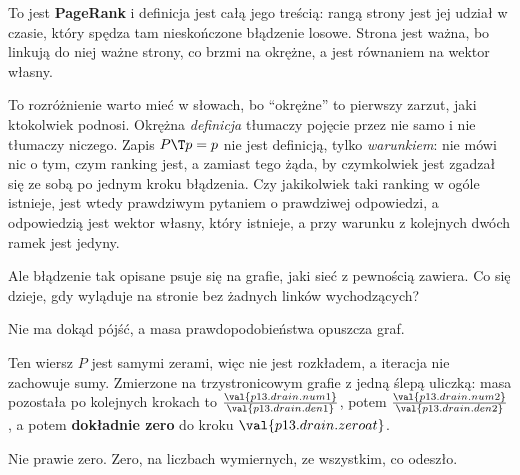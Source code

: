 \begin{fr}
To jest \textbf{PageRank} i definicja jest całą jego
treścią: rangą strony
jest jej udział w czasie, który spędza tam nieskończone błądzenie losowe.
Strona jest ważna, bo linkują do niej ważne strony, co brzmi na okrężne, a
jest równaniem na wektor własny.

To rozróżnienie warto mieć w słowach, bo \enquote{okrężne} to pierwszy
zarzut, jaki ktokolwiek podnosi. Okrężna \emph{definicja} tłumaczy pojęcie
przez nie samo i nie tłumaczy niczego. Zapis $P\T p = p$ nie jest definicją,
tylko \emph{warunkiem}: nie mówi nic o tym, czym ranking jest, a zamiast tego
żąda, by \dash{} czymkolwiek jest \dash{} zgadzał się ze sobą po jednym kroku
błądzenia. Czy jakikolwiek taki ranking w ogóle istnieje, jest wtedy
prawdziwym pytaniem o prawdziwej odpowiedzi, a odpowiedzią jest wektor własny,
który istnieje, a przy warunku z kolejnych dwóch ramek jest jedyny.

Ale błądzenie tak opisane psuje się na grafie, jaki sieć z pewnością zawiera.
Co się dzieje, gdy wyląduje na stronie bez żadnych linków wychodzących?
\dotline
\nextframe
\end{fr}

\begin{fr}
\begin{ansblock}
Nie ma dokąd pójść, a masa prawdopodobieństwa opuszcza graf.
\end{ansblock}

Ten wiersz $P$ jest samymi zerami, więc nie jest rozkładem, a iteracja nie
zachowuje sumy. Zmierzone na trzystronicowym grafie z jedną ślepą uliczką:
masa pozostała po kolejnych krokach to
$\frac{\val{p13.drain.num1}}{\val{p13.drain.den1}}$, potem
$\frac{\val{p13.drain.num2}}{\val{p13.drain.den2}}$, a potem
\textbf{dokładnie zero} do kroku $\val{p13.drain.zeroat}$.

Nie prawie zero. Zero, na liczbach wymiernych, ze wszystkim, co odeszło.
\end{fr}

